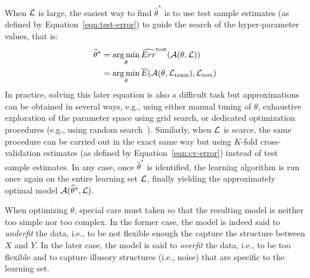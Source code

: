 When ${\cal L}$ is large, the easiest way to find $\widehat{\theta}^*$ is to
use test sample estimates (as defined by Equation~\ref{eqn:test-error}) to
guide the search of the hyper-parameter values, that is:
\begin{align}
\widehat{\theta}^* &= \operatorname*{arg\,min}_{\theta} \widehat{Err}^\text{test}({\cal A}(\theta, {\cal L})) \\
                   &= \operatorname*{arg\,min}_{\theta} \overline{E}({\cal A}(\theta, {\cal L}_\text{train}), {\cal L}_\text{test})
\end{align}
In practice, solving this later equation is also a difficult task but
approximations can be obtained in several ways, e.g., using either manual
tuning of $\theta$, exhaustive exploration of the parameter space using grid
search, or dedicated optimization procedures (e.g., using random
search~\citep{bergstra:2012}). Similarly, when ${\cal L}$ is scarce, the same
procedure can be carried out in the exact same way but using $K$-fold
cross-validation estimates (as defined by Equation~\ref{eqn:cv-error}) instead of test sample
estimates. In any case, once $\widehat{\theta}^*$ is identified, the learning
algorithm is run once again on the entire learning set ${\cal L}$, finally
yielding the approximately optimal model ${\cal A}(\widehat{\theta}^*, {\cal
L})$.

When optimizing $\theta$, special care must taken so that the resulting model
is neither too simple nor too complex. In the former case, the model is indeed
said to \textit{underfit} the data, i.e., to be not flexible enough the capture
the structure between $X$ and $Y$. In the later case, the model is said to
\textit{overfit} the data, i.e., to be too flexible and to capture illusory
structures (i.e., noise) that are specific to the learning set.

